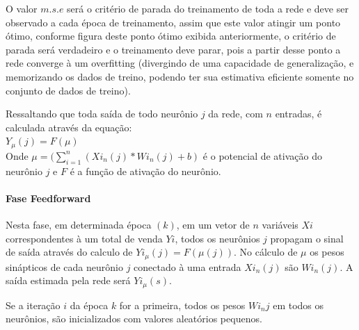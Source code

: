 \documentclass[	12pt, Times, openright, twoside, a4paper, english, brazil]{abntex2}
\begin{document}
            O valor $m.s.e$ será o critério de parada do treinamento de toda a rede e deve ser observado a cada época de treinamento, assim que este valor atingir um ponto ótimo, conforme figura deste ponto ótimo exibida anteriormente, o critério de parada será verdadeiro e o treinamento deve parar, pois a partir desse ponto a rede converge à um overfitting (divergindo de uma capacidade de generalização, e memorizando os dados de treino, podendo ter sua estimativa eficiente somente no conjunto de dados de treino).
            
            Ressaltando que toda saída de todo neurônio $j$ da rede, com $n$ entradas, é calculada através da equação:\\
            $ Y_{\mu}(j) = F(\mu)$\\
            Onde $\mu = (\sum_{i=1}^{n} (Xi_{n}(j)*Wi_{n}(j) + b)$ é o potencial de ativação do neurônio $j$ e $F$ é a função de ativação do neurônio.
            
           \paragraph*{Fase Feedforward}
            Nesta fase, em determinada época $(k)$, em um vetor de $n$ variáveis $Xi$ correspondentes à um total de venda $Yi$, todos os neurônios $j$ propagam o sinal de saída através do calculo de $Yi_{\mu}(j) = F(\mu(j))$. No cálculo de $\mu$ os pesos sinápticos de cada neurônio $j$ conectado à uma entrada $Xi_{n}(j)$ são $Wi_{n}(j)$. A saída estimada pela rede será $Yi_{\mu}(s)$.
            
            Se a iteração $i$ da época $k$ for a primeira, todos os pesos $Wi_{n}j$ em todos os neurônios, são inicializados com valores aleatórios pequenos.\\ 
            
            
            \begin{figure}[H]
           \end{figure}
           
\end{document}
